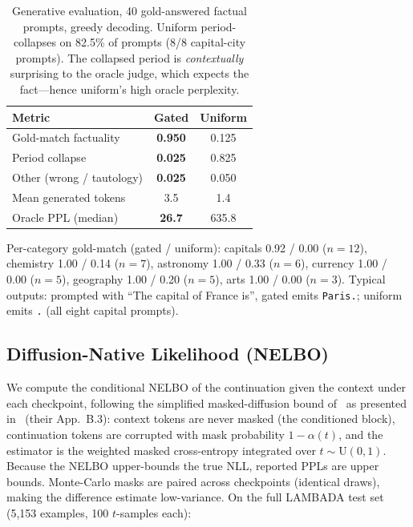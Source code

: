 \documentclass{article}
\begin{document}
\begin{table}[h]
\centering
\begin{tabular}{lcc}
\toprule
Metric & Gated & Uniform \\
\midrule
Gold-match factuality & \textbf{0.950} & 0.125 \\
Period collapse & \textbf{0.025} & 0.825 \\
Other (wrong / tautology) & \textbf{0.025} & 0.050 \\
Mean generated tokens & 3.5 & 1.4 \\
Oracle PPL (median) & \textbf{26.7} & 635.8 \\
\bottomrule
\end{tabular}
\caption{Generative evaluation, 40 gold-answered factual prompts, greedy decoding.
Uniform period-collapses on 82.5\% of prompts (8/8 capital-city prompts). The
collapsed period is \emph{contextually} surprising to the oracle judge, which expects
the fact---hence uniform's high oracle perplexity.}
\label{tab:generative}
\end{table}

Per-category gold-match (gated / uniform): capitals 0.92 / 0.00 ($n{=}12$),
chemistry 1.00 / 0.14 ($n{=}7$), astronomy 1.00 / 0.33 ($n{=}6$), currency
1.00 / 0.00 ($n{=}5$), geography 1.00 / 0.20 ($n{=}5$), arts 1.00 / 0.00 ($n{=}3$).
Typical outputs: prompted with ``The capital of France is'', gated emits
\texttt{Paris.}; uniform emits \texttt{.} (all eight capital prompts).

\subsection{Diffusion-Native Likelihood (NELBO)}
\label{sec:elbo}

We compute the conditional NELBO of the continuation given the context under each
checkpoint, following the simplified masked-diffusion bound
of~\cite{sahoo2024mdlm} as presented in~\cite{arriola2025blockdiffusion} (their
App.~B.3): context tokens are never masked (the conditioned block), continuation
tokens are corrupted with mask probability $1 - \alpha(t)$, and the estimator is the
weighted masked cross-entropy integrated over $t \sim \mathrm{U}(0,1)$. Because the
NELBO upper-bounds the true NLL, reported PPLs are upper bounds. Monte-Carlo masks
are paired across checkpoints (identical draws), making the difference estimate
low-variance. On the full LAMBADA test set (5{,}153 examples, 100 $t$-samples each):
\end{document}

